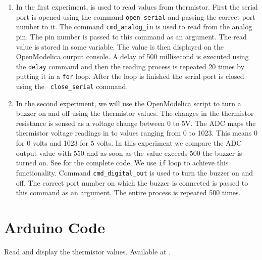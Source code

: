 \begin{enumerate}
\item In the first experiment,  is used to read
  values from thermistor. First the serial port is opened using the
  command {\tt open\_serial} and passing the correct port number to
  it. The command {\tt cmd\_analog\_in} is used to read from the
  analog pin. The pin number is passed to this command as an
  argument. The read value is stored in some variable. The value is
  then displayed on the OpenModelica ourput console. A delay of 500 millisecond is
  executed using the {\tt delay} command and then the reading process
  is repeated 20 times by putting it in a {\tt for} loop. After the
  loop is finished the serial port is closed using the {\tt
    close\_serial} command.

\item In the second experiment, we will use the OpenModelica script to
  turn a buzzer on and off using the thermistor values. The changes in
  the thermistor resistance is sensed as a voltage change between 0 to
  5V. The ADC maps the thermistor voltage readings in to values
  ranging from 0 to 1023. This means 0 for 0 volts and 1023 for 5
  volts. In this experiment we compare the ADC output value with 550
  and as soon as the value exceeds 500 the buzzer is turned on. See
   for the complete code. We use {\tt if}
  loop to achieve this functionality. Command {\tt cmd\_digital\_out}
  is used to turn the buzzer on and off.  The correct port number on
  which the buzzer is connected is passed to this command as an
  argument. The entire process is repeated 500 times.
\end{enumerate}



\clearpage
\section{Arduino Code}
\label{sec:therm-arduino-code}

\begin{ardcode}
   {Read and display
    the thermistor values.  Available at
    .}
\label{ard:therm-read}

\end{ardcode}

